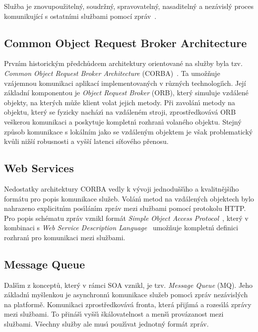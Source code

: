 \begin{definition}
    Služba je znovupoužitelný, soudržný, spravovatelný, nasaditelný a nezávislý proces komunikující
    s ostatními službami pomocí zpráv~\cite{dragoni2017microservices, papazoglou2003service}.
\end{definition}

\subsection{Common Object Request Broker Architecture}\label{sec:corba}

Prvn\'{\i}m historick\'ym předchůdcem architektury orientované na služby
byla tzv. \textit{Common Object Request Broker Architecture}
(\gls{CORBA})~\cite{siegel2000corba}. Ta umožňuje vzájemnou komunikaci aplikací
implementovan\'ych v různ\'ych technologi\'{\i}ch. Její základní komponentou
je \textit{Object Request Broker} (\gls{ORB}), kter\'y simuluje vzdálené objekty,
na kter\'ych může klient volat jejich metody. Při zavolán\'{\i} metody
na objektu, kter\'y se fyzicky nacház\'{\i} na vzdáleném stroji,
zprostředkovává \gls{ORB} veškerou komunikaci a poskytuje kompletn\'{\i} rozhran\'{\i}
volaného objektu. Stejný způsob komunikace s lokálním jako se vzdáleným objektem je však
problematický kvůli nižší robusnosti a vyšší latenci síťového přenosu.

\subsection{Web Services}

Nedostatky architektury \gls{CORBA} vedly k vývoji jednodušš\'{\i}ho
a kvalitnějšího formátu pro popis komunikace služeb. Volán\'{\i} metod na vzdálen\'ych objektech
bylo nahrazeno explicitn\'{\i}m pos\'{\i}lán\'{\i}m zpráv mezi službami pomocí protokolu \gls{HTTP}.
Pro popis schématu zpráv vznikl formát \textit{Simple Object Access
Protocol}~\cite{box2000simple}, kter\'y v kombinaci s
\textit{Web Service Description Language}~\cite{christensen2001web}
umožňuje kompletn\'{\i} definici rozhran\'{\i} pro komunikaci mezi službami.

\subsection{Message Queue}

Dalš\'{\i}m z konceptů, kter\'y v rámci \gls{SOA} vznikl, je tzv. \textit{Message Queue} (\gls{MQ}).
Jeho základn\'{\i} myšlenkou je asynchronn\'{\i} komunikace služeb pomoc\'{\i} zpráv nezávisl\'ych
na platformě. Komunikaci zprostředkovává fronta, která přij\'{\i}má a rozes\'{\i}lá
zprávy mezi službami. To přináš\'{\i} vyšš\'{\i} škálovatelnost a menš\'{\i} provázanost
mezi službami. Všechny služby ale mus\'{\i} použ\'{\i}vat jednotn\'y formát zpráv.

